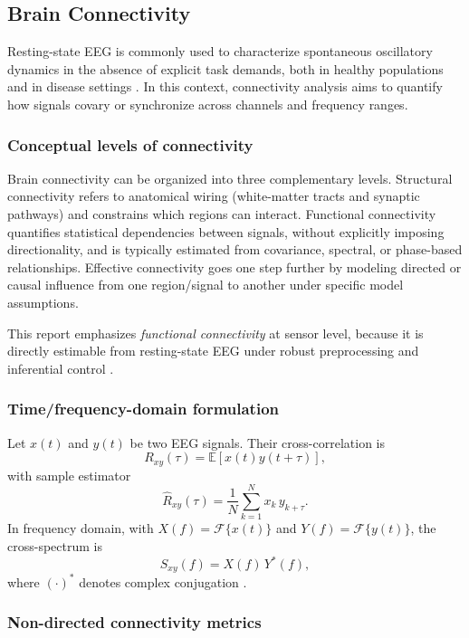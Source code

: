 \subsection{Brain Connectivity}

Resting-state EEG is commonly used to characterize spontaneous oscillatory dynamics in the absence of explicit task demands, both in healthy populations and in disease settings \citep{Cohen2014,Yamada2018}. In this context, connectivity analysis aims to quantify how signals covary or synchronize across channels and frequency ranges.

\subsubsection{Conceptual levels of connectivity}

Brain connectivity can be organized into three complementary levels. Structural connectivity refers to anatomical wiring (white-matter tracts and synaptic pathways) and constrains which regions can interact. Functional connectivity quantifies statistical dependencies between signals, without explicitly imposing directionality, and is typically estimated from covariance, spectral, or phase-based relationships. Effective connectivity goes one step further by modeling directed or causal influence from one region/signal to another under specific model assumptions.

This report emphasizes \emph{functional connectivity} at sensor level, because it is directly estimable from resting-state EEG under robust preprocessing and inferential control \citep{Cohen2014,Vinck2011WPLI,Cao2022EEGConnectivity}.

\subsubsection{Time/frequency-domain formulation}

Let $x(t)$ and $y(t)$ be two EEG signals. Their cross-correlation is
\[
R_{xy}(\tau)=\mathbb{E}[x(t)y(t+\tau)],
\]
with sample estimator
\[
\hat{R}_{xy}(\tau)=\frac{1}{N}\sum_{k=1}^{N}x_k\,y_{k+\tau}.
\]
In frequency domain, with $X(f)=\mathcal{F}\{x(t)\}$ and $Y(f)=\mathcal{F}\{y(t)\}$, the cross-spectrum is
\[
S_{xy}(f)=X(f)\,Y^*(f),
\]
where $(\cdot)^*$ denotes complex conjugation \citep{Cohen2014,Ruth2020,Sanei2022}.

\subsubsection{Non-directed connectivity metrics}

